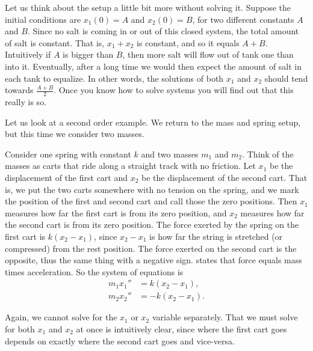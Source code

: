 \begin{example}
Let us think about the setup a little bit more without solving it.  Suppose the
initial conditions are $x_1(0) = A$ and $x_2(0) = B$, for two different
constants $A$ and $B$.  Since no salt is coming in or out of this closed system,
the total amount of salt is constant.  That is, $x_1+x_2$ is constant,
and so it equals $A+B$.
Intuitively if $A$ is bigger than $B$, then more salt will flow out of tank
one than into it.  Eventually, after a long time we would then expect
the amount of salt in each tank to equalize. In other words,
the solutions of both $x_1$ and $x_2$ should
tend towards $\frac{A+B}{2}$.  Once you know how to solve systems
you will find out that this really is so.
\end{example}

\begin{example} \label{sintro:carts-example}
Let us look at a second order example.
We return to the mass and spring setup, but this time we
consider two masses.

\begin{mywrapfigsimp}{2.0in}{2.3in}
\noindent
{}
\end{mywrapfigsimp}
Consider one spring with constant $k$ and two masses $m_1$
and $m_2$.  Think of the masses as carts that 
ride along a straight track with no friction.  Let $x_1$ be the displacement of the first
cart and $x_2$ be the displacement of the second cart.
That is, we put the two
carts somewhere with no tension on the spring, and we mark the position of
the first and second cart and call those the zero positions.
Then $x_1$ measures how far the first cart is from its zero position,
and $x_2$ measures how far the second cart is from its zero position.
The force exerted by the spring on the first cart is
$k(x_2-x_1)$,
since $x_2-x_1$ is how far the string is stretched (or compressed) from
the rest position.  The force exerted on the second cart is the opposite,
thus the same thing with a negative sign.
 states that
force equals mass times acceleration.  So the system of equations is
\begin{align*}
m_1 x_1'' & = k(x_2-x_1) , \\
m_2 x_2'' & = - k(x_2-x_1) .
\end{align*}

Again, we cannot solve for the $x_1$ or $x_2$ variable separately.
That we must solve for both $x_1$ and $x_2$ at once
is intuitively clear, since where the first cart goes
depends on exactly where the second cart goes and vice-versa.
\end{example}


